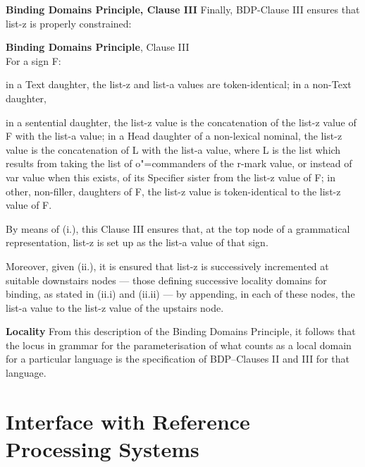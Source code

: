 \documentclass[output=paper
	        ,collection
	        ,collectionchapter
 	        ,biblatex
                ,babelshorthands
                ,newtxmath
                ,draftmode
                ,colorlinks, citecolor=brown
]{langscibook}
\begin{document}
\pagebreak
\textbf{Binding Domains Principle, Clause III}  Finally, BDP-Clause III ensures that {\sc list-z} is properly
constrained:

\begin{samepage}
\begin{exe}
\ex
\textbf{Binding Domains Principle}, Clause III\\
For a sign F:
\begin{xlisti}
\ex	in a Text daughter, the {\sc list-z} and {\sc list-a} values are token-identical;
\ex	in a non-Text daughter,
\begin{xlisti} 
\ex in a sentential daughter, the {\sc list-z} value is the concatenation of the {\sc
list-z} value of F with the {\sc list-a} value; 
\ex in a Head daughter of a non-lexical nominal, the {\sc list-z} value is the concatenation of L
with the {\sc list-a} value, where L is the list which results from taking the list of
o"=commanders of the {\sc r-mark} value, or instead of {\sc var} value when this exists,
of its Specifier sister from the {\sc list-z} value of F;
\ex in other, non-filler, daughters of F, the {\sc list-z} value is token-iden\-ti\-cal to
the {\sc list-z} value of F.
\end{xlisti}
\end{xlisti}

\end{exe}
\end{samepage}

By means of (i.), this Clause III ensures that, at the top
node of a grammatical representation, {\sc list-z} is set up as the
{\sc list-a} value of that sign. 

Moreover, given (ii.), it is ensured that {\sc list-z} is successively
incremented at suitable downstairs nodes --- those defining
successive locality domains for binding, as stated in (ii.i) and
(ii.ii) --- by appending, 
in each of these nodes, the {\sc list-a} value to the {\sc list-z} value
of the upstairs node.

\textbf{Locality} From this description of the Binding Domains Principle, it follows 
that the locus in grammar for the parameterisation 
of what counts as a local domain for a particular language is 
the specification of BDP--Clauses II and III for that language.



\section{Interface with Reference Processing Systems \label{discuss}}
\end{document}
